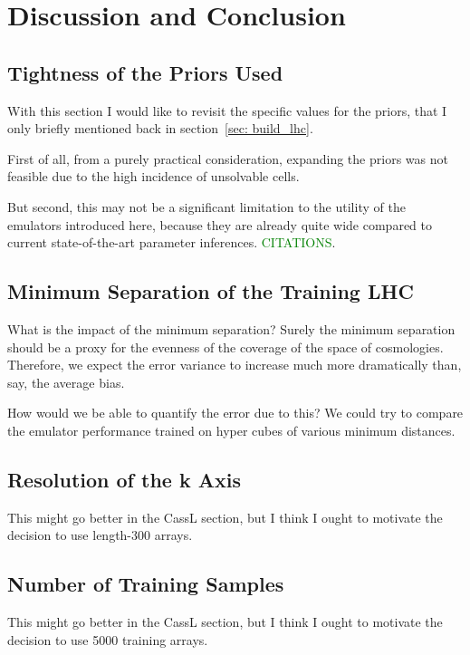 \chapter{Discussion and Conclusion}

\section{Tightness of the Priors Used}
\label{sec: priors}

With this section I would like to revisit the specific values for the priors,
that I only briefly mentioned back in section~\ref{sec: build_lhc}.

First of all, from a purely practical consideration, expanding the priors was
not feasible due to the high incidence of unsolvable cells.

But second, this may not be a significant limitation to the utility of the
emulators introduced here, because they are already quite wide compared to
current state-of-the-art parameter inferences. \textcolor{green}{CITATIONS}.

\section{Minimum Separation of the Training LHC}
\label{sec: error_from_lhc}

What is the impact of the minimum separation? Surely the minimum separation
should be a proxy for the evenness of the coverage of the space of
cosmologies. Therefore, we expect the error variance to increase much more
dramatically than, say, the average bias.

How would we
be able to quantify the error due to this? We could try to compare the
emulator performance trained on hyper cubes of various minimum distances.

\section{Resolution of the k Axis}

This might go better in the CassL section, but I think I ought to motivate the decision to use length-300 arrays.

\section{Number of Training Samples}

This might go better in the CassL section, but I think I ought to motivate the decision to use 5000 training arrays.

